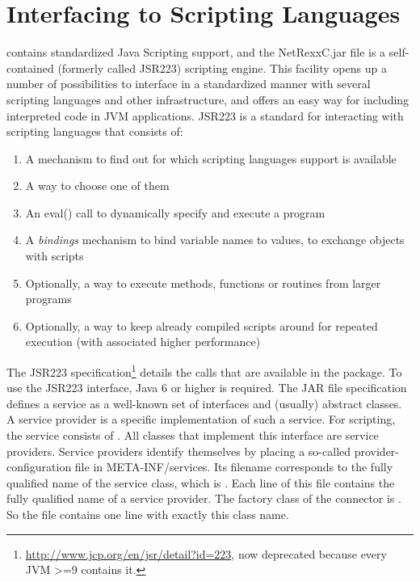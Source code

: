 \chapter{Interfacing to Scripting Languages}
\nr{} contains standardized Java Scripting
support, and the NetRexxC.jar file is a
self-contained  (formerly called JSR223) scripting engine. This facility opens up a number of possibilities to interface in a standardized manner with several scripting languages and other infrastructure, and offers an easy way for including interpreted \nr{} code in JVM applications. JSR223 is a standard for interacting with scripting languages that consists of:
\begin{enumerate}
\item A mechanism to find out for which scripting languages support is
  available
\item A way to choose one of them
\item An eval() call to dynamically specify and execute a program
\item A \emph{bindings} mechanism to bind variable names to values, to exchange objects with scripts
\item Optionally, a way to execute methods, functions or routines from
  larger programs
\item Optionally, a way to keep already compiled scripts around for repeated execution (with associated higher performance)
\end{enumerate}

The JSR223
specification\footnote{\url{http://www.jcp.org/en/jsr/detail?id=223},
now deprecated because every JVM >=9 contains it.}
details the calls that are available in the 
package. To use the JSR223 interface, Java 6 or higher is
required. The JAR file specification defines a service as a well-known
set of interfaces and (usually) abstract classes. A service provider
is a specific implementation of such a service. For scripting, the
service consists of . All
classes that implement this interface are service providers. Service
providers identify themselves by placing a so-called
provider-configuration file in META-INF/services. Its filename
corresponds to the fully qualified name of the service class, which is
. Each line of this file contains the
fully qualified name of a service provider. The factory
class of the \nr{} connector is . So the file  contains one line with exactly this class name.
